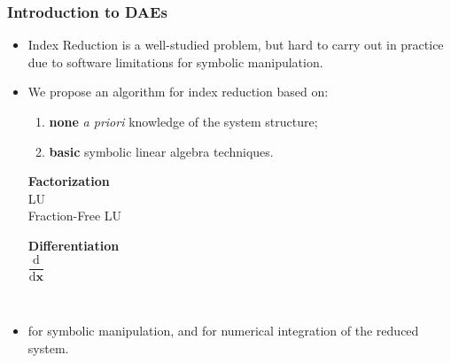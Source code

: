 \begin{frame}
  \frametitle{Introduction to \aclp{DAE}}
  \begin{itemize}
    \item Index Reduction is a well-studied problem, but hard to carry out in practice due to software limitations for symbolic manipulation.
    \\[1.0em]
    \item We propose an algorithm for index reduction based on:
    \\[0.5em]
    \begin{enumerate}
      \item \textbf{none} \emph{a priori} knowledge of the system structure;
      \\[0.5em]
      \item \textbf{basic} symbolic linear algebra techniques.
    \end{enumerate}
    \begin{center}\begin{minipage}[t]{0.30\textwidth}\begin{block}{}
      \centering
      \textbf{Factorization} \\[0.5em]
      LU \\ Fraction-Free LU \vspace*{0.15cm}
    \end{block}\end{minipage}
    \hspace*{2cm}
    \begin{minipage}[t]{0.30\textwidth}\begin{block}{}
      \centering
      \textbf{Differentiation} \\[0.75em]
      $\dfrac{\text{d}}{\text{d}\textbf{x}}$ \vspace*{0.15cm}
    \end{block}\end{minipage} \\[1.75em] \end{center}
    \item \Maple{} for symbolic manipulation, and \Matlab{} for numerical integration of the reduced system.
  \end{itemize}
\end{frame}

